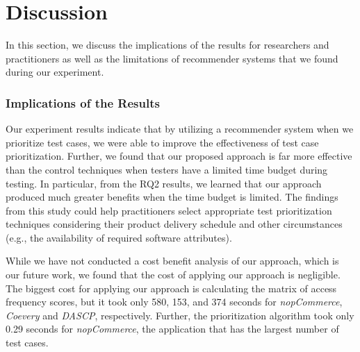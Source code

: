 \section{Discussion}
\label{sec:discussion}

In this section, we discuss the implications of the results for
researchers and practitioners as well as the limitations of
recommender systems that we found during our experiment.

\vspace*{2pt}
\subsubsection*{Implications of the Results}

Our experiment results indicate that by utilizing a recommender system
when we prioritize test cases, we were able to improve the effectiveness 
of test case prioritization. Further, we found that our proposed approach
is far more effective than the control techniques when testers have a 
limited time budget during testing. 
In particular, from the RQ2 results, we learned that our approach produced
much greater benefits when the time budget is limited.
The findings from this study could help practitioners select appropriate {\large }
test prioritization techniques considering their product delivery schedule   
and other circumstances (e.g., the availability of required software attributes). 



While we have not conducted a cost benefit analysis of our approach,
which is our future work, we found that the cost of applying our approach is
negligible. The biggest cost for applying our approach is calculating the matrix
of access frequency scores, but it took only 580, 153, and 374 seconds
for {\em nopCommerce}, {\em Coevery} and {\em DASCP}, respectively.  
Further, the prioritization algorithm took only 0.29 seconds for {\em nopCommerce},
the application that has the largest number of test cases.

